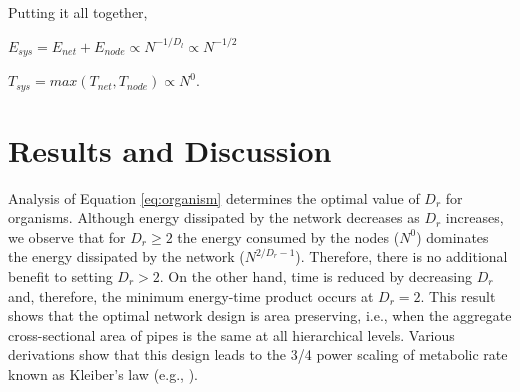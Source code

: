 \documentclass[12pt]{article}
\begin{document}
Putting it all together, 

$E_{sys} = E_{net} + E_{node} \propto N^{-1/D_l} \propto N^{-1/2}$ 

$T_{sys}  = max(T_{net}, T_{node}) \propto N^0$.


%
%
%
%

\section{Results and Discussion}
\label{sec:discussion}

 
Analysis of Equation \ref{eq:organism} determines the optimal value of 
$D_r$ for organisms. Although energy dissipated by the network 
decreases as $D_r$ increases, we observe that for $D_r\geq 2$ the 
energy consumed by the nodes ($N^0$) dominates the energy dissipated 
by the network ($N^{2/D_r - 1}$).  Therefore, there is no additional 
benefit to setting $D_r>2$.  On the other hand, time is reduced by 
decreasing $D_r$ and, therefore, the minimum energy-time product 
occurs at $D_r = 2$.  This result shows that the optimal network 
design is area preserving, i.e., when the aggregate cross-sectional 
area of pipes is the same at all hierarchical levels. Various 
derivations show that this design leads to the 3/4 power scaling of 
metabolic rate known as Kleiber's law (e.g., \cite{west97, 
banavar10}).
\end{document}
